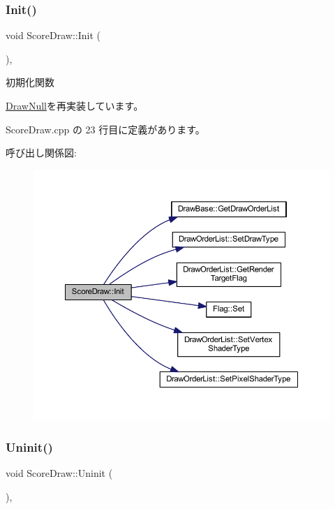 \subsubsection{\texorpdfstring{Init()}{Init()}}
{\footnotesize\ttfamily void Score\+Draw\+::\+Init (\begin{DoxyParamCaption}{ }\end{DoxyParamCaption})\hspace{0.3cm}{\ttfamily [override]}, {\ttfamily [virtual]}}



初期化関数 



\mbox{\hyperlink{class_draw_null_acd7fef3ccea1da537ac9507ffbb6dd2e}{Draw\+Null}}を再実装しています。



 Score\+Draw.\+cpp の 23 行目に定義があります。

呼び出し関係図\+:\nopagebreak
\begin{figure}[H]
\begin{center}
\leavevmode
\includegraphics[width=350pt]{class_score_draw_af013abb96136825e71d4fee06529fc69_cgraph}
\end{center}
\end{figure}
\mbox{\label{class_score_draw_aad744f8a7a1202e6ba8117c660f297ee}} 
\subsubsection{\texorpdfstring{Uninit()}{Uninit()}}
{\footnotesize\ttfamily void Score\+Draw\+::\+Uninit (\begin{DoxyParamCaption}{ }\end{DoxyParamCaption})\hspace{0.3cm}{\ttfamily [override]}, {\ttfamily [virtual]}}




